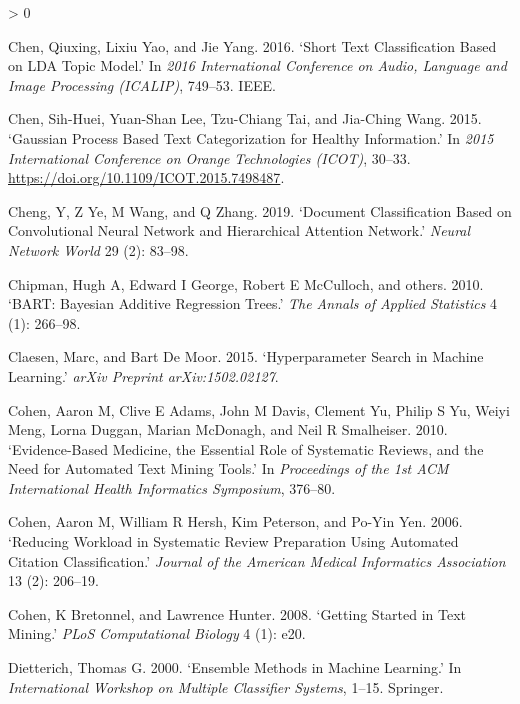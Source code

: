 \documentclass{article}
\newlength{\cslhangindent}
\newenvironment{CSLReferences}[2] %
 {%
  \setlength{\parindent}{0pt}
  \ifodd #1 \everypar{\setlength{\hangindent}{\cslhangindent}}\ignorespaces\fi
  \ifnum #2 > 0
  \setlength{\parskip}{#2\baselineskip}
  \fi
 }%
 {}
\begin{document}
\begin{CSLReferences}{1}{0}
\leavevmode\hypertarget{ref-chen2016short}{}%
Chen, Qiuxing, Lixiu Yao, and Jie Yang. 2016. {`Short Text
Classification Based on LDA Topic Model.'} In \emph{2016 International
Conference on Audio, Language and Image Processing (ICALIP)}, 749--53.
IEEE.

\leavevmode\hypertarget{ref-chen2015gaussian}{}%
Chen, Sih-Huei, Yuan-Shan Lee, Tzu-Chiang Tai, and Jia-Ching Wang. 2015.
{`Gaussian Process Based Text Categorization for Healthy Information.'}
In \emph{2015 International Conference on Orange Technologies (ICOT)},
30--33. \url{https://doi.org/10.1109/ICOT.2015.7498487}.

\leavevmode\hypertarget{ref-cheng2019document}{}%
Cheng, Y, Z Ye, M Wang, and Q Zhang. 2019. {`Document Classification
Based on Convolutional Neural Network and Hierarchical Attention
Network.'} \emph{Neural Network World} 29 (2): 83--98.

\leavevmode\hypertarget{ref-chipman2010bart}{}%
Chipman, Hugh A, Edward I George, Robert E McCulloch, and others. 2010.
{`BART: Bayesian Additive Regression Trees.'} \emph{The Annals of
Applied Statistics} 4 (1): 266--98.

\leavevmode\hypertarget{ref-claesen2015hyperparameter}{}%
Claesen, Marc, and Bart De Moor. 2015. {`Hyperparameter Search in
Machine Learning.'} \emph{arXiv Preprint arXiv:1502.02127}.

\leavevmode\hypertarget{ref-cohen2010evidence}{}%
Cohen, Aaron M, Clive E Adams, John M Davis, Clement Yu, Philip S Yu,
Weiyi Meng, Lorna Duggan, Marian McDonagh, and Neil R Smalheiser. 2010.
{`Evidence-Based Medicine, the Essential Role of Systematic Reviews, and
the Need for Automated Text Mining Tools.'} In \emph{Proceedings of the
1st ACM International Health Informatics Symposium}, 376--80.

\leavevmode\hypertarget{ref-cohen2006reducing}{}%
Cohen, Aaron M, William R Hersh, Kim Peterson, and Po-Yin Yen. 2006.
{`Reducing Workload in Systematic Review Preparation Using Automated
Citation Classification.'} \emph{Journal of the American Medical
Informatics Association} 13 (2): 206--19.

\leavevmode\hypertarget{ref-cohen2008getting}{}%
Cohen, K Bretonnel, and Lawrence Hunter. 2008. {`Getting Started in Text
Mining.'} \emph{PLoS Computational Biology} 4 (1): e20.

\leavevmode\hypertarget{ref-dietterich2000ensemble}{}%
Dietterich, Thomas G. 2000. {`Ensemble Methods in Machine Learning.'} In
\emph{International Workshop on Multiple Classifier Systems}, 1--15.
Springer.


\end{CSLReferences}
\end{document}
